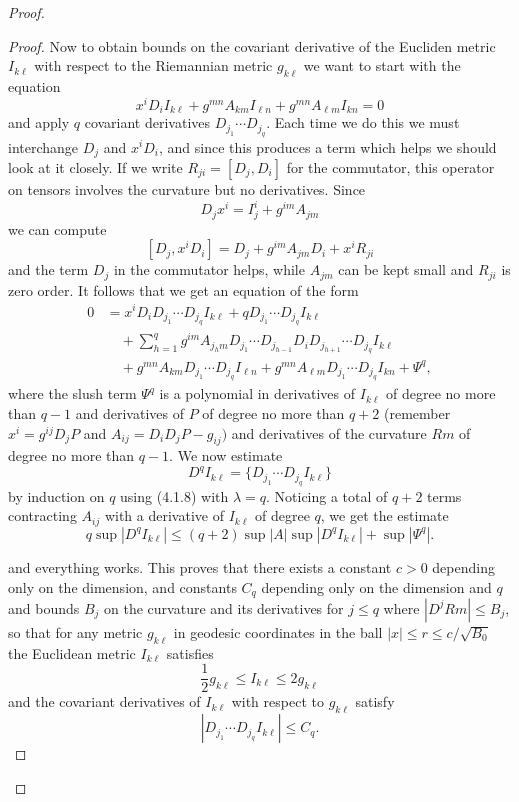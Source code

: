 \begin{proof}
\begin{proof}
Now to obtain bounds on the covariant derivative of the Eucliden
metric $I_{k \ell}$ with respect to the Riemannian metric $g_{k
\ell}$ we want to start with the equation
$$
x^iD_iI_{k \ell}+g^{mn}A_{km}I_{\ell n}+g^{mn}A_{\ell m}I_{kn}=0
$$
and apply $q$ covariant derivatives $D_{j_1} \cdots D_{j_q}$. Each
time we do this we must interchange $D_j$ and $x^iD_i$, and since
this produces a term which helps we should look at it closely. If
we write $R_{ji}=[D_j,D_i]$ for the commutator, this operator on
tensors involves the curvature but no derivatives. Since
$$
D_jx^i=I^i_j+g^{im}A_{jm}
$$
we can compute
$$
[D_j, x^iD_i]=D_j+g^{im}A_{jm}D_i+x^iR_{ji}
$$
and the term $D_j$ in the commutator helps, while $A_{jm}$ can be
kept small and $R_{ji}$ is zero order. It follows that we get an
equation of the form
\begin{align*}
0 &  = x^iD_iD_{j_1} \cdots D_{j_q}I_{k \ell} + qD_{j_1} \cdots
D_{j_q}I_{k \ell} \\
&\quad  + \sum^q_{h=1} g^{im}A_{j_hm}D_{j_1} \cdots
D_{j_{h-1}}D_iD_{j_{h+1}} \cdots D_{j_q}I_{k \ell} \\
&\quad  + g^{mn}A_{km}D_{j_1} \cdots D_{j_q}I_{\ell n} + g^{mn}
A_{\ell m} D_{j_1} \cdots D_{j_q}I_{kn}+ \Psi^q,
\end{align*}
where the slush term $\Psi^q$ is a polynomial in derivatives of
$I_{k \ell}$ of degree no more than $q-1$ and derivatives of $P$
of degree no more than $q+2$ (remember $x^i = g^{ij}D_jP$ and
$A_{ij} = D_iD_jP-g_{ij})$ and derivatives of the curvature $Rm$
of degree no more than $q-1$. We now estimate
$$
D^qI_{k \ell} = \{D_{j_1} \cdots D_{j_q}I_{k \ell}\}
$$
by induction on $q$ using (4.1.8) with $\lambda = q$. Noticing a
total of $q+2$ terms contracting $A_{ij}$ with a derivative of
$I_{k \ell}$ of degree $q$, we get the estimate
$$
q \sup |D^qI_{k \ell}| \leq (q+2) \operatorname{sup}|A|
\operatorname{sup} |D^q I_{k \ell} | + \operatorname{sup} |
\Psi^q|.
$$

\noindent and everything works. This proves that there exists a
constant $c>0$ depending only on the dimension, and constants
$C_q$ depending only on the dimension and $q$ and bounds $B_j$ on
the curvature and its derivatives for $j \leq q$ where $|D^jRm|
\leq B_j$, so that for any metric $g_{k \ell}$ in geodesic
coordinates in the ball $|x| \leq r \leq c/ \sqrt{B_0}$ the
Euclidean metric $I_{k \ell}$ satisfies
$$
\frac{1}{2} g_{k \ell}\leq I_{k \ell} \leq 2g_{k \ell}
$$
and the covariant derivatives of $I_{k \ell}$ with respect to
$g_{k \ell}$ satisfy
$$
|D_{j_1} \cdots D_{j_q}I_{k \ell}| \leq C_q.
$$


\end{proof}
\end{proof}
